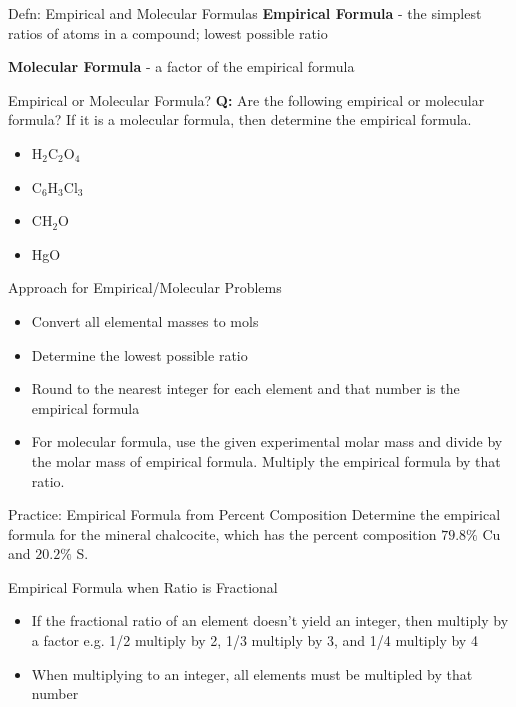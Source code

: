 \documentclass[11pt]{beamer}
\begin{document}
\begin{frame}{Defn: Empirical and Molecular Formulas}
  \textbf{Empirical Formula} - the simplest ratios of atoms in
  a compound; lowest possible ratio

  \textbf{Molecular Formula} - a factor of the empirical formula
\end{frame}

\begin{frame}{Empirical or Molecular Formula?}
  \textbf{Q:} Are the following empirical or molecular formula? If it is a
  molecular formula, then determine the empirical formula.

  \begin{itemize}
  \item H$_2$C$_2$O$_4$
  \item C$_6$H$_3$Cl$_3$
  \item CH$_2$O
  \item HgO
  \end{itemize}
\end{frame}

\begin{frame}{Approach for Empirical/Molecular Problems}
  \begin{itemize}
  \item Convert all elemental masses to mols
  \item Determine the lowest possible ratio
  \item Round to the nearest integer for each element and that
    number is the empirical formula
  \item For molecular formula, use the given experimental molar
    mass and divide by the molar mass of empirical formula. Multiply
    the empirical formula by that ratio.
  \end{itemize}
\end{frame}

\begin{frame}{Practice: Empirical Formula from Percent Composition}
  Determine the empirical formula for the mineral chalcocite, which has
  the percent composition $79.8\%$ Cu and $20.2\%$ S.
  \vfill
\end{frame}

\begin{frame}{Empirical Formula when Ratio is Fractional}
  \begin{itemize}
  \item If the fractional ratio of an element doesn't yield an integer,
    then multiply by a factor e.g. 1/2 multiply by 2, 1/3 multiply by 3, and
    1/4 multiply by 4
  \item When multiplying to an integer, all elements must be multipled by that number
  \end{itemize}
\end{frame}
\end{document}
